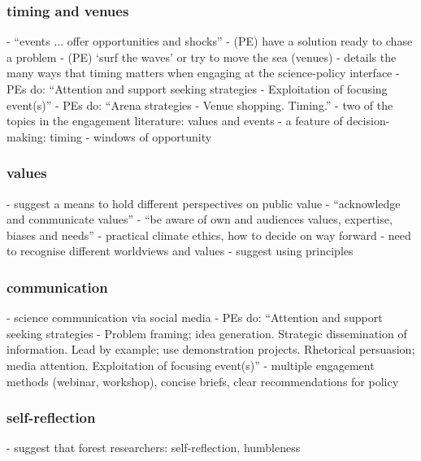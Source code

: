 \subsubsection{timing and venues}
\cite{CairneyW2017} - ``events ... offer opportunities and shocks''
\cite{Cairney2018} - (PE) have a solution ready to chase a problem
\cite{Cairney2018} - (PE) `surf the waves' or try to move the sea (venues)
\cite{GluckmanBK2021} - details the many ways that timing matters when engaging at the science-policy interface
\cite{vonMalmborg2024strategies} - PEs do: ``Attention and support seeking strategies - Exploitation of focusing event(s)''
\cite{vonMalmborg2024strategies} - PEs do: ``Arena strategies - Venue shopping. Timing.''
\cite{CairneyO2020} - two of the topics in the engagement literature: values and events
\cite{MoallemiZHSMZHKHMGLB2023} - a feature of decision-making: timing
\cite{ThompsonD2024} - windows of opportunity

\subsubsection{values}
\cite{GeuijenMCRv2017} - suggest a means to hold different perspectives on public value
\cite{GregoryBW2024} - ``acknowledge and communicate values''
\cite{ElsensohnACDGGKPRS2019} - ``be aware of own and audiences values, expertise, biases and needs''
\cite{VoisardW2023} - practical climate ethics, how to decide on way forward
\cite{PascualEtAl2018} - need to recognise different worldviews and values
\cite{RogeljLPLWXXXX} - suggest using principles

\subsubsection{communication}
\cite{LubchencoR2020} - science communication via social media 
\cite{vonMalmborg2024strategies} - PEs do: ``Attention and support seeking strategies - Problem framing; idea generation. Strategic dissemination of information. Lead by example; use demonstration projects. Rhetorical persuasion; media attention. Exploitation of focusing event(s)''
\cite{ThompsonD2024} - multiple engagement methods (webinar, workshop), concise briefs, clear recommendations for policy

\subsubsection{self-reflection}
\cite{OjanenBKP2021} - suggest that forest researchers: self-reflection, humbleness

